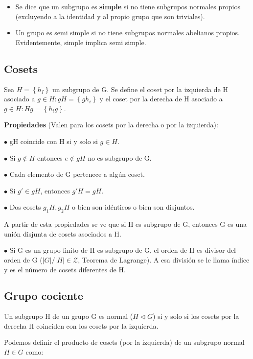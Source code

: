 \begin{itemize}
\item Se dice que un subgrupo es \textbf{simple} si no tiene subgrupos normales propios (excluyendo a la identidad y al propio grupo que son triviales).
\item Un grupo es semi simple si no tiene subgrupos normales abelianos propios. Evidentemente, simple implica semi simple.
\end{itemize}

\subsection{Cosets}

Sea $H=\left \lbrace h_I\right \rbrace$ un subgrupo de G. Se define el coset por la izquierda de H asociado a $g\in H : gH= \left \lbrace gh_i\right \rbrace$ y el coset por la derecha de H asociado a $g\in H : Hg= \left \lbrace h_i g\right \rbrace$.

\smallskip
\textbf{Propiedades} (Valen para los cosets por la derecha o por la izquierda):

\smallskip
$\bullet$ gH coincide con H si y solo si $g\in H$.

\smallskip
$\bullet$ Si $g\notin H$ entonces $e\notin gH$ no es subgrupo de G.

\smallskip
$\bullet$ Cada elemento de G pertenece a algún coset.

\smallskip
$\bullet$ Si $g'\in gH$, entonces $g'H=gH$.

\smallskip
$\bullet$ Dos cosets $g_1H, g_2H$ o bien son idénticos o bien son disjuntos.

\smallskip
A partir de esta propiedades se ve que si H es subgrupo de G, entonces G es una unión disjunta de cosets asociados a H.

\smallskip
$\bullet$ Si G es un grupo finito de H es subgrupo de G, el orden de H es divisor del orden de G ($|G|/|H|\in \mathcal{Z}$, Teorema de Lagrange). A esa división se le llama índice y es el número de cosets diferentes de H.

\subsection{Grupo cociente}
Un subgrupo H de un grupo G es normal ($H\lhd G$) si y solo si los cosets por la derecha H coinciden con los cosets por la izquierda.

Podemos definir el producto de cosets (por la izquierda) de un subgrupo normal $H\in G$ como:

